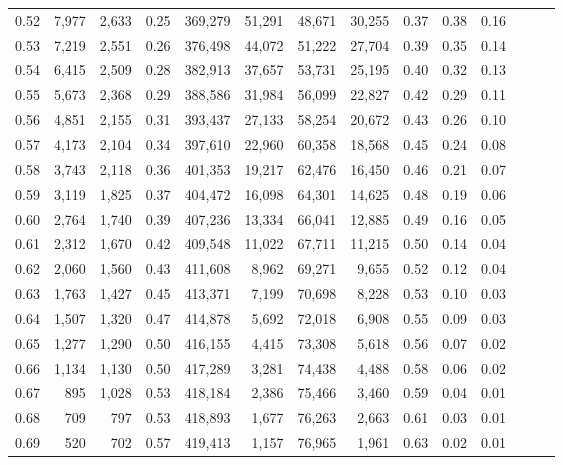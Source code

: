 \begin{tabular}{rrrrrrrrrrrrrr}
0.52 &   7,977 &  2,633 &  0.25 &  369,279 &   51,291 &  48,671 &  30,255 &  0.37 &  0.38 &      0.16 \\
0.53 &   7,219 &  2,551 &  0.26 &  376,498 &   44,072 &  51,222 &  27,704 &  0.39 &  0.35 &      0.14 \\
0.54 &   6,415 &  2,509 &  0.28 &  382,913 &   37,657 &  53,731 &  25,195 &  0.40 &  0.32 &      0.13 \\
0.55 &   5,673 &  2,368 &  0.29 &  388,586 &   31,984 &  56,099 &  22,827 &  0.42 &  0.29 &      0.11 \\
0.56 &   4,851 &  2,155 &  0.31 &  393,437 &   27,133 &  58,254 &  20,672 &  0.43 &  0.26 &      0.10 \\
0.57 &   4,173 &  2,104 &  0.34 &  397,610 &   22,960 &  60,358 &  18,568 &  0.45 &  0.24 &      0.08 \\
0.58 &   3,743 &  2,118 &  0.36 &  401,353 &   19,217 &  62,476 &  16,450 &  0.46 &  0.21 &      0.07 \\
0.59 &   3,119 &  1,825 &  0.37 &  404,472 &   16,098 &  64,301 &  14,625 &  0.48 &  0.19 &      0.06 \\
0.60 &   2,764 &  1,740 &  0.39 &  407,236 &   13,334 &  66,041 &  12,885 &  0.49 &  0.16 &      0.05 \\
0.61 &   2,312 &  1,670 &  0.42 &  409,548 &   11,022 &  67,711 &  11,215 &  0.50 &  0.14 &      0.04 \\
0.62 &   2,060 &  1,560 &  0.43 &  411,608 &    8,962 &  69,271 &   9,655 &  0.52 &  0.12 &      0.04 \\
0.63 &   1,763 &  1,427 &  0.45 &  413,371 &    7,199 &  70,698 &   8,228 &  0.53 &  0.10 &      0.03 \\
0.64 &   1,507 &  1,320 &  0.47 &  414,878 &    5,692 &  72,018 &   6,908 &  0.55 &  0.09 &      0.03 \\
0.65 &   1,277 &  1,290 &  0.50 &  416,155 &    4,415 &  73,308 &   5,618 &  0.56 &  0.07 &      0.02 \\
0.66 &   1,134 &  1,130 &  0.50 &  417,289 &    3,281 &  74,438 &   4,488 &  0.58 &  0.06 &      0.02 \\
0.67 &     895 &  1,028 &  0.53 &  418,184 &    2,386 &  75,466 &   3,460 &  0.59 &  0.04 &      0.01 \\
0.68 &     709 &    797 &  0.53 &  418,893 &    1,677 &  76,263 &   2,663 &  0.61 &  0.03 &      0.01 \\
0.69 &     520 &    702 &  0.57 &  419,413 &    1,157 &  76,965 &   1,961 &  0.63 &  0.02 &      0.01 \\

\end{tabular}
